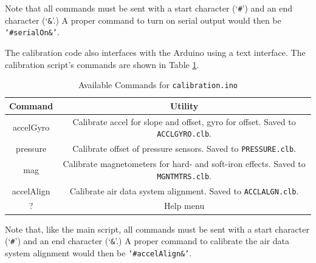 Note that all commands must be sent with a start character (`\texttt{\#}') and an end character (`\texttt{\&}'.) A proper command to turn on serial output would then be \texttt{`\#serialOn\&'}.

The calibration code also interfaces with the Arduino using a text interface. The calibration script's commands are shown in Table \ref{table:calibComms}.
\begin{table}[H]
\caption{Available Commands for \texttt{calibration.ino}}
\centering
\begin{tabular}{|c | c|}
\hline
 Command & Utility\\
 \hline\hline
accelGyro & Calibrate accel for slope and offset, gyro for offset. 
Saved to \texttt{ACCLGYRO.clb}.\\\hline
pressure & Calibrate offset of pressure sensors. 
Saved to \texttt{PRESSURE.clb}.\\\hline
mag & Calibrate magnetometers for hard- and soft-iron effects. 
Saved to \texttt{MGNTMTRS.clb}.\\\hline
accelAlign & Calibrate air data system alignment.
 Saved to \texttt{ACCLALGN.clb}.\\\hline
? & Help menu\\\hline
\end{tabular}
\label{table:calibComms}
\end{table}

Note that, like the main script, all commands must be sent with a start character (`\texttt{\#}') and an end character (`\texttt{\&}'.) A proper command to calibrate the air data system alignment would then be \texttt{`\#accelAlign\&'}.